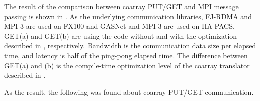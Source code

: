 The result of the comparison between coarray PUT/GET and MPI message passing is shown in
.
As the underlying communication libraries, 
FJ-RDMA and MPI-3 are used on FX100 and GASNet and MPI-3 are used on HA-PACS.
GET(a) and GET(b) are using the code without and with the optimization described in
, respectively.
Bandwidth is the communication data size per elapsed time, and
latency is half of the ping-pong elapsed time.
The difference between GET(a) and (b) is the compile-time optimization level of the 
coarray translator described in .



As the result, the following was found about coarray PUT/GET communication.

